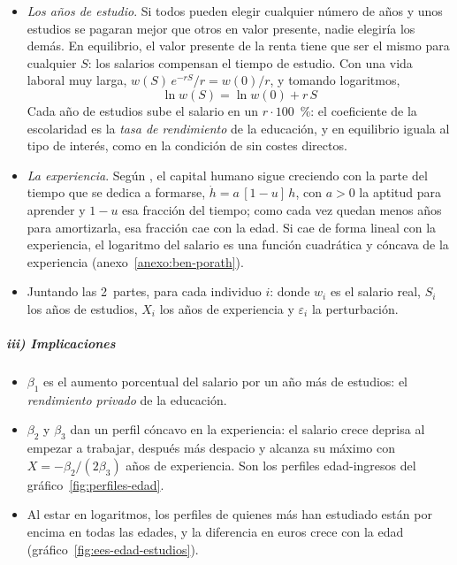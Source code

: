 \documentclass[11pt]{article}
\begin{document}
\begin{itemize}
\item \emph{Los años de estudio}. Si todos pueden elegir cualquier número de años y unos estudios se pagaran mejor que otros en valor presente, nadie elegiría los demás. En equilibrio, el valor presente de la renta tiene que ser el mismo para cualquier $S$: los salarios compensan el tiempo de estudio. Con una vida laboral muy larga, $w(S)\,e^{-rS}/r=w(0)/r$, y tomando logaritmos,
  \begin{equation}
  \ln w(S)=\ln w(0)+r\,S\label{eq:mincer-escolarizacion}
  \end{equation}
  Cada año de estudios sube el salario en un $r\cdot 100$~\%: el coeficiente de la escolaridad es la \emph{tasa de rendimiento} de la educación, y en equilibrio iguala al tipo de interés, como en la condición de  sin costes directos.
\item \emph{La experiencia}. Según \textcite{BenPorath1967Production}, el capital humano sigue creciendo con la parte del tiempo que se dedica a formarse, $\dot h=a\,[1-u]\,h$, con $a>0$ la aptitud para aprender y $1-u$ esa fracción del tiempo; como cada vez quedan menos años para amortizarla, esa fracción cae con la edad. Si cae de forma lineal con la experiencia, el logaritmo del salario es una función cuadrática y cóncava de la experiencia (anexo~\ref{anexo:ben-porath}).
\item Juntando las 2~partes, para cada individuo $i$:
  donde $w_i$ es el salario real, $S_i$ los años de estudios, $X_i$ los años de experiencia y $\varepsilon_i$ la perturbación.
\end{itemize}

\subparagraph{iii) Implicaciones}

\begin{itemize}
\item $\beta_1$ es el aumento porcentual del salario por un año más de estudios: el \emph{rendimiento privado} de la educación.
\item $\beta_2$ y $\beta_3$ dan un perfil cóncavo en la experiencia: el salario crece deprisa al empezar a trabajar, después más despacio y alcanza su máximo con $X=-\beta_2/(2\beta_3)$ años de experiencia. Son los perfiles edad-ingresos del gráfico~\ref{fig:perfiles-edad}.
\item Al estar en logaritmos, los perfiles de quienes más han estudiado están por encima en todas las edades, y la diferencia en euros crece con la edad (gráfico~\ref{fig:ees-edad-estudios}).
\end{itemize}
\end{document}

